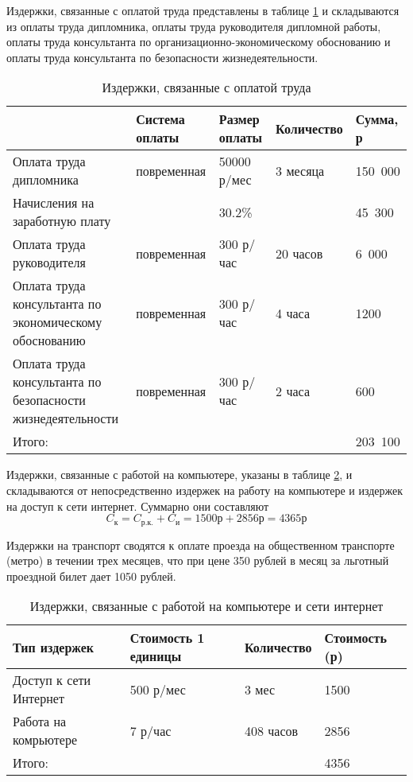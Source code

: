 Издержки, связанные с оплатой труда представлены в таблице \ref{costs-salary}
и складываются из оплаты труда дипломника, оплаты труда руководителя дипломной работы, оплаты труда консультанта по организационно-экономическому обоснованию и оплаты труда консультанта по безопасности жизнедеятельности.

\begin{table}
\center
\caption{Издержки, связанные с оплатой труда}
\label{costs-salary}
\begin{tabular}{|p{4cm}|p{3cm}|p{2cm}|p{2.5cm}|p{2cm}|}
\hline 
 & Система оплаты & Размер оплаты & Количество & Сумма, р \\ 
\hline 
Оплата труда дипломника & повременная & 50000 р/мес & 3 месяца & 150~000 \\ 
\hline
Начисления на заработную плату &  & 30.2\% & & 45~300\\ 
\hline 
Оплата труда руководителя & повременная & 300 р/час & 20 часов & 6~000 \\ 
\hline 
Оплата труда консультанта по экономическому обоснованию & повременная & 300 р/час & 4 часа & 1200 \\ 
\hline 
Оплата труда консультанта по безопасности жизнедеятельности & повременная & 300 р/час & 2 часа & 600 \\ 
\hline 
Итого:  &  &  &  & 203~100 \\ 
\hline 
\end{tabular}
\end{table}

Издержки, связанные с работой на компьютере, указаны в таблице \ref{costs-computer},
и складываются от непосредственно издержек на работу на компьютере и издержек на 
доступ к сети интернет. Суммарно они составляют
$$ C_{к}= C_{р.к.} + C_{и} = 1500 р + 2856 р = 4365 р $$

Издержки на транспорт сводятся к оплате проезда на общественном транспорте (метро) в течении трех месяцев, что при цене 350 рублей в месяц за льготный проездной билет дает 1050 рублей.

\begin{table}
\center
\caption{Издержки, связанные с работой на компьютере и сети интернет}
\label{costs-computer}
\begin{tabular}{|p{3cm}|p{3cm}|p{3cm}|p{3cm}|}
\hline 
Тип издержек & Стоимость 1 единицы & Количество & Стоимость (р) \\ 
\hline 
Доступ к сети Интернет & 500 р/мес & 3 мес & 1500 \\ 
\hline
Работа на комрьютере & 7 р/час & 408 часов & 2856\\ 
\hline 
Итого:  &  &  & 4356 \\ 
\hline
\end{tabular}
\end{table}

